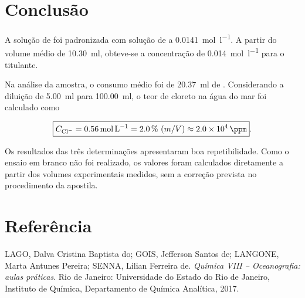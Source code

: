\documentclass[a4paper,12pt]{article}
\begin{document}
\section{Conclusão}

A solução de  foi padronizada com solução de
 a \qty{0.0141}{\mole\per\litre}. A partir do volume médio de
\qty{10.30}{\milli\litre}, obteve-se a concentração de
\qty{0.014}{\mole\per\litre} para o titulante.

Na análise da amostra, o consumo médio foi de
\qty{20.37}{\milli\litre} de . Considerando a diluição de
\qty{5.00}{\milli\litre} para \qty{100.00}{\milli\litre}, o teor de
cloreto na água do mar foi calculado como

\begin{equation*}
  \boxed{
  C_{\ce{Cl-}}=\qty{0.56}{\mole\per\litre}
  =\qty{2.0}{\percent}\ (m/V)
  \approx\qty{2.0e4}{\ppm}
  }.
\end{equation*}

Os resultados das três determinações apresentaram boa repetibilidade.
Como o ensaio em branco não foi realizado, os valores foram calculados
diretamente a partir dos volumes experimentais medidos, sem a correção
prevista no procedimento da apostila.

\section*{Referência}

LAGO, Dalva Cristina Baptista do; GOIS, Jefferson Santos de; LANGONE,
Marta Antunes Pereira; SENNA, Lilian Ferreira de.
\textit{Química VIII -- Oceanografia: aulas práticas}.
Rio de Janeiro: Universidade do Estado do Rio de Janeiro,
Instituto de Química, Departamento de Química Analítica, 2017.
\end{document}
